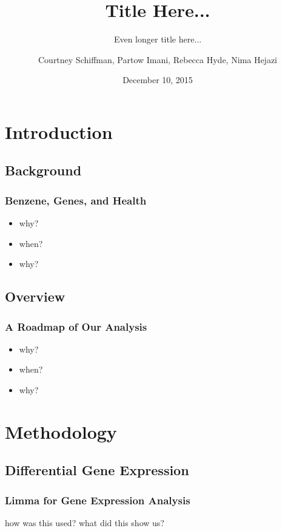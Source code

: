 \documentclass{beamer}
\title{Title Here...}
\subtitle{Even longer title here...}
\author{Courtney Schiffman, Partow Imani, Rebecca Hyde, Nima Hejazi}
\institute[UC Berkeley]{University of California, Berkeley}
\date{December 10, 2015}
\begin{document}
\frame{\titlepage}

\section[Outline]{}
\frame{\tableofcontents}


\section{Introduction}

\subsection{Background}

\begin{frame}[fragile]
  	\frametitle{Benzene, Genes, and Health}
  		\begin{itemize}
  			\item why?
 			\item when?
  			\item why?     
  		\end{itemize}
\end{frame}

\subsection{Overview}

\begin{frame}[fragile]
  	\frametitle{A Roadmap of Our Analysis}
 		\begin{itemize}
  			\item why?
 			\item when?
  			\item why?     
  		\end{itemize}
\end{frame}

\section{Methodology}

\subsection{Differential Gene Expression}

\begin{frame}[fragile]
  	\frametitle{Limma for Gene Expression Analysis}
 		how was this used?
		what did this show us?
\end{frame}
\end{document}
